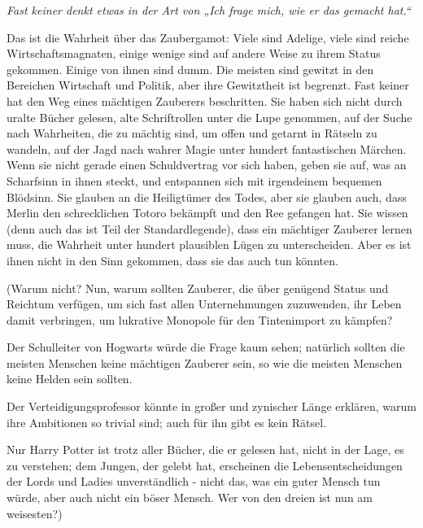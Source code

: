 {\emph{Fast keiner denkt etwas in der Art von „Ich frage mich, wie er das gemacht hat.“}

Das ist die Wahrheit über das Zaubergamot: Viele sind Adelige, viele sind reiche Wirtschaftsmagnaten, einige wenige sind auf andere Weise zu ihrem Status gekommen. Einige von ihnen sind dumm. Die meisten sind gewitzt in den Bereichen Wirtschaft und Politik, aber ihre Gewitztheit ist begrenzt. Fast keiner hat den Weg eines mächtigen Zauberers beschritten. Sie haben sich nicht durch uralte Bücher gelesen, alte Schriftrollen unter die Lupe genommen, auf der Suche nach Wahrheiten, die zu mächtig sind, um offen und getarnt in Rätseln zu wandeln, auf der Jagd nach wahrer Magie unter hundert fantastischen Märchen. Wenn sie nicht gerade einen Schuldvertrag vor sich haben, geben sie auf, was an Scharfsinn in ihnen steckt, und entspannen sich mit irgendeinem bequemen Blödsinn. Sie glauben an die Heiligtümer des Todes, aber sie glauben auch, dass Merlin den schrecklichen Totoro bekämpft und den Ree gefangen hat. Sie wissen (denn auch das ist Teil der Standardlegende), dass ein mächtiger Zauberer lernen muss, die Wahrheit unter hundert plausiblen Lügen zu unterscheiden. Aber es ist ihnen nicht in den Sinn gekommen, dass sie das auch tun könnten.

(Warum nicht? Nun, warum sollten Zauberer, die über genügend Status und Reichtum verfügen, um sich fast allen Unternehmungen zuzuwenden, ihr Leben damit verbringen, um lukrative Monopole für den Tintenimport zu kämpfen?

Der Schulleiter von Hogwarts würde die Frage kaum sehen; natürlich sollten die meisten Menschen keine mächtigen Zauberer sein, so wie die meisten Menschen keine Helden sein sollten.

Der Verteidigungsprofessor könnte in großer und zynischer Länge erklären, warum ihre Ambitionen so trivial sind; auch für ihn gibt es kein Rätsel.

Nur Harry Potter ist trotz aller Bücher, die er gelesen hat, nicht in der Lage, es zu verstehen; dem Jungen, der gelebt hat, erscheinen die Lebensentscheidungen der Lords und Ladies unverständlich - nicht das, was ein guter Mensch tun würde, aber auch nicht ein böser Mensch. Wer von den dreien ist nun am weisesten?)

}
